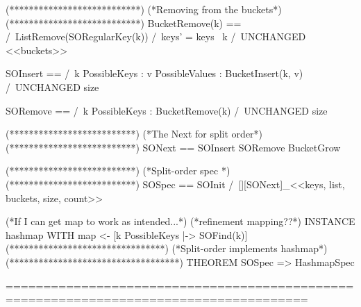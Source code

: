 \documentclass{uit-thesis}
\begin{document}
\begin{tla}
                     (***************************)
                     (*Removing from the buckets*)
                     (***************************)                
                     BucketRemove(k) == /\ ListRemove(SORegularKey(k))
                     /\ keys' = keys \ {k}
                     /\ UNCHANGED <<buckets>>
                     
                     
                     SOInsert == /\  \E k \in PossibleKeys :
                     \E v \in PossibleValues :
                     BucketInsert(k, v)
                     /\ UNCHANGED size
                     
                     SORemove == /\  \E k \in PossibleKeys :
                     BucketRemove(k)
                     /\ UNCHANGED size
                     
                     
                     (**************************)
                     (*The Next for split order*)
                     (**************************)
                     SONext ==   \/ SOInsert
                     \/ SORemove
                     \/ BucketGrow
                     
                     (**************************)
                     (*Split-order spec         *)
                     (**************************)
                     SOSpec == SOInit /\ [][SONext]_<<keys, list, buckets, size, count>>
                     
                     
                     (*If I can get map to work as intended...*)
                     (*refinement mapping??*)
                     INSTANCE  hashmap WITH map <- [k \in PossibleKeys |-> SOFind(k)]
                     (********************************)
                     (*Split-order implements hashmap*)
                     (***********************************)
                     THEOREM SOSpec => HashmapSpec
                     
                     ======================================================================================
    \end{tla}
\end{document}

